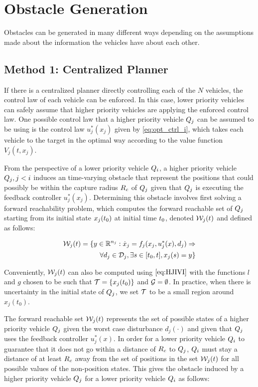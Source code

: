 \section{Obstacle Generation \label{sec:obs_gen}}
Obstacles can be generated in many different ways depending on the assumptions made about the information the vehicles have about each other.

\subsection{Method 1: Centralized Planner}
If there is a centralized planner directly controlling each of the $N$ vehicles, the control law of each vehicle can be enforced. In this case, lower priority vehicles can safely assume that higher priority vehicles are applying the enforced control law. One possible control law that a higher priority vehicle $Q_j$ can be assumed to be using is the control law $u_j^*(x_j)$ given by \eqref{eq:opt_ctrl_i}, which takes each vehicle to the target in the optimal way according to the value function $V_j(t, x_j)$.

From the perspective of a lower priority vehicle $Q_i$, a higher priority vehicle $Q_j, j < i$ induces an time-varying obstacle that represent the positions that could possibly be within the capture radius $R_c$ of $Q_j$ given that $Q_j$ is executing the feedback controller $u_j^*(x_j)$. Determining this obstacle involves first solving a forward reachability problem, which computes the forward reachable set of $Q_j$ starting from its initial state $x_j(t_0)$ at initial time $t_0$, denoted $\mathcal{W}_j(t)$ and defined as follows:

\begin{equation}
\label{eq:frs}
\begin{aligned}
\mathcal{W}_j(t) = \{y \in \mathbb{R}^{n_j}: \dot{x}_j = f_j(x_j, u_j^*(x), d_j) \Rightarrow \\
\forall d_j \in \mathcal{D}_j, \exists s \in [t_0, t], x_j(s) = y\}
\end{aligned}
\end{equation}

Conveniently, $\mathcal{W}_j(t)$ can also be computed using $\eqref{eq:HJIVI}$ with the functions $l$ and $g$ chosen to be such that $\mathcal{T} = \{x_j(t_0)\}$ and $\mathcal{G} = \emptyset$. In practice, when there is uncertainty in the initial state of $Q_j$, we set $\mathcal{T}$ to be a small region around $x_j(t_0)$.

The forward reachable set $\mathcal{W}_j(t)$ represents the set of possible states of a higher priority vehicle $Q_j$ given the worst case disturbance $d_j(\cdot)$ and given that $Q_j$ uses the feedback controller $u_j^*(x)$. In order for a lower priority vehicle $Q_i$ to guarantee that it does not go within a distance of $R_c$ to $Q_j$, $Q_i$ must stay a distance of at least $R_c$ away from the set of positions in the set $\mathcal{W}_j(t)$ for all possible values of the non-position states. This gives the obstacle induced by a higher priority vehicle $Q_j$ for a lower priority vehicle $Q_i$ as follows:

